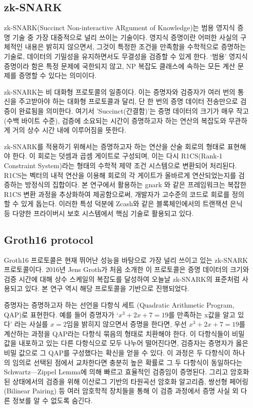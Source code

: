 
\subsection{zk-SNARK}
zk-SNARK(Succinct Non-interactive ARgument of Knowledge)는 범용 영지식 증명 기술 중 가장 대중적으로 널리 쓰이는 기술이다. 영지식 증명이란 어떠한 사실의 구체적인 내용은 밝히지 않으면서, 그것이 특정한 조건을 만족함을 수학적으로 증명하는 기술로, 데이터의 기밀성을 유지하면서도 무결성을 검증할 수 있게 한다. ‘범용’ 영지식 증명이라 함은 특정 문제에 국한되지 않고, NP 복잡도 클래스에 속하는 모든 계산 문제를 증명할 수 있다는 의미이다.

\bigskip

zk-SNARK는 비 대화형 프로토콜의 일종이다. 이는 증명자와 검증자가 여러 번의 통신을 주고받아야 하는 대화형 프로토콜과 달리, 단 한 번의 증명 데이터 전송만으로 검증이 완료됨을 의미한다. 여기서 'Succinct(간결함)'는 증명 데이터의 크기가 매우 작고(수백 바이트 수준), 검증에 소요되는 시간이 증명하고자 하는 연산의 복잡도와 무관하게 거의 상수 시간 내에 이루어짐을 뜻한다.

\bigskip

zk-SNARK를 적용하기 위해서는 증명하고자 하는 연산을 산술 회로의 형태로 표현해야 한다. 이 회로는 덧셈과 곱셈 게이트로 구성되며, 이는 다시 R1CS(Rank-1 Constraint System)라는 형태의 수학적 제약 조건 시스템으로 변환되어 처리된다. R1CS는 벡터의 내적 연산을 이용해 회로의 각 게이트가 올바르게 연산되었는지를 검증하는 방정식의 집합이다. 본 연구에서 활용하는 gnark 와 같은 프레임워크는 복잡한 R1CS 변환 과정을 추상화하여 제공함으로써, 개발자가 고수준의 코드로 회로를 정의할 수 있게 돕는다. 이러한 특성 덕분에 Zcash와 같은 블록체인에서의 트랜잭션 은닉 등 다양한 프라이버시 보호 시스템에서 핵심 기술로 활용되고 있다.

\subsection{Groth16 protocol}
Groth16 프로토콜은 현재 뛰어난 성능을 바탕으로 가장 널리 쓰이고 있는 zk-SNARK 프로토콜이다. 2016년 Jens Groth\cite{groth2016}가 처음 소개한 이 프로토콜은 증명 데이터의 크기와 검증 시간에 대해 상수 스케일의 복잡도를 달성하여 오늘날 zk-SNARK의 표준처럼 사용되고 있다. 본 연구 역시 해당 프로토콜을 기반으로 진행되었다.

\bigskip

증명자는 증명하고자 하는 선언을 다항식 세트 (Quadratic Arithmetic Program, QAP)로 표현한다. 예를 들어 증명자가 ‘$x^3+2x+7=19$를 만족하는 x값을 알고 있다’ 라는 사실를 $x=2$임을 밝히지 않으면서 증명을 한다면, 우선 $x^3+2x+7=19$를 계산하는 과정을 QAP라는 다항식 묶음의 형태로 치환해야 한다. 이 다항식들이 비밀 값을 내포하고 있는 다른 다항식으로 모두 나누어 떨어진다면, 검증자는 증명자가 옳은 비밀 값으로 그 QAP를 구성했다는 확신을 얻을 수 있다. 이 과정은 두 다항식이 하나의 임의로 선택된 점에서 교차한다면 충분히 높은 확률로 그 두 다항식이 동일하다는 Schwartz—Zippel Lemma에 의해 빠르고 효율적인 검증임이 증명된다. 그리고 암호화된 상태에서의 검증을 위해 이산로그 기반의 타원곡선 암호화 알고리즘, 쌍선형 페어링(Bilinear Pairing) 등 여러 암호학적 장치들을 통해 이 검증 과정에서 증명 사실 외 다른 정보를 알 수 없도록 숨긴다.

